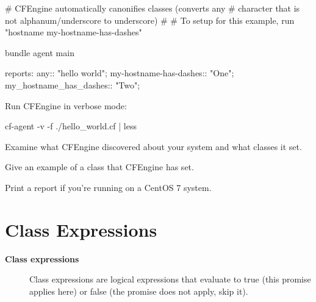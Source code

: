 \begin{codelisting}
\begin{code}
# CFEngine automatically canonifies classes (converts any
# character that is not alphanum/underscore to underscore)
#
# To setup for this example, run "hostname my-hostname-has-dashes"

bundle agent main
{
  reports:
    any::
      "hello world";
    my-hostname-has-dashes::
      "One";
    my_hostname_has_dashes::
      "Two";

}

\end{code}
\end{codelisting}





\begin{aside}
\label{aside:exercise_18}

Run CFEngine in verbose mode:

\begin{code}
cf-agent -v -f ./hello_world.cf | less
\end{code}

Examine what CFEngine discovered about your system and what classes it set.

Give an example of a class that CFEngine has set.

\end{aside}





\begin{aside}
\label{aside:exercise_19}

Print a report if you're running on a CentOS 7 system.

\end{aside}





\section{Class Expressions}





\begin{description}
\item[\textbf{Class expressions}] Class expressions are logical expressions that evaluate to true (this
promise applies here) or false (the promise does not apply, skip it).
\end{description}

